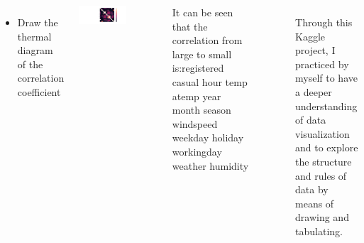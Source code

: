 \documentclass{tikzposter} %
\begin{document}
\begin{columns}
{    \begin{itemize}                            
        \item
        Draw the thermal diagram of the correlation coefficient
    \end{itemize}
    \begin{minipage}{1\linewidth}
        \centering
        \includegraphics[width=0.6\textwidth]{pic1/hot.png} 
    \end{minipage}
    It can be seen that the correlation from large to small is:registered    casual  hour  temp   atemp  year   month  season  windspeed     weekday       holiday workingday   weather      
    humidity     
}




{
\begin{description}
  \item[]
  Through this Kaggle project, I practiced by myself to have a deeper understanding of data visualization and to explore the structure and rules of data by means of drawing and tabulating.

\end{description}
}





\end{columns}
\end{document}
